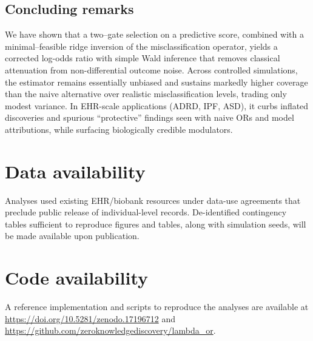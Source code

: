 \documentclass[lineno]{biometrika}
\begin{document}
\subsection*{Concluding remarks}
We have shown that a two–gate selection on a predictive score, combined with a minimal–feasible ridge inversion of the misclassification operator, yields a corrected log-odds ratio with simple Wald inference that removes classical attenuation from non-differential outcome noise. Across controlled simulations, the estimator remains essentially unbiased and sustains markedly higher coverage than the naive alternative over realistic misclassification levels, trading only modest variance. In EHR-scale applications (ADRD, IPF, ASD), it curbs inflated discoveries and spurious “protective” findings seen with naive ORs and model attributions, while surfacing biologically credible modulators. 

\section{Data availability}
Analyses used existing EHR/biobank resources under data-use agreements that preclude public release of individual-level records. De-identified contingency tables sufficient to reproduce figures and tables, along with simulation seeds, will be made available upon publication.

\section{Code availability}
A reference implementation and scripts to reproduce the analyses are available at  \url{https://doi.org/10.5281/zenodo.17196712} and \url{https://github.com/zeroknowledgediscovery/lambda_or}.



\end{document}
